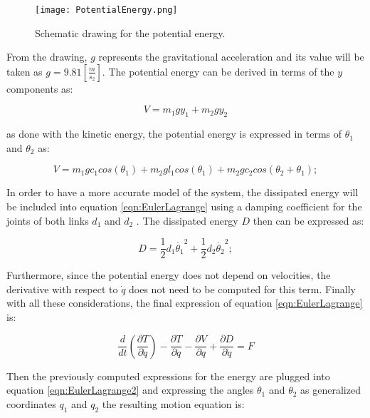 \documentclass[main.tex]{subfiles}
\begin{document}
\begin{figure}[h]
\centering
\texttt{[image: PotentialEnergy.png]}
\caption{\label{fig:PotentialEnergy} Schematic drawing for the potential energy.}
\end{figure}


From the drawing, $g$  represents the gravitational acceleration and its value will be taken as $g=9.81 [\frac{m}{s_2}]$. The potential energy can be derived in terms of the $y$ components as:

\begin{equation}
V = m_1 g y_1 + m_2 g y_2
\end{equation}

as done with the kinetic energy, the potential energy is expressed in terms of $\theta_1$ and $\theta_2$ as:

\begin{equation}
V = m_1 g c_1 cos(\theta_1) + m_2 g l_1 cos(\theta_1) + m_2 g c_2cos(\theta_2 + \theta_1);
\end{equation}

In order to have a more accurate model of the system, the dissipated energy will be included into equation \ref{eqn:EulerLagrange} using a damping coefficient for the joints of both links $d_1$  and $d_2$ . The dissipated energy $D$ then can be expressed as:

\begin{equation}
D =\frac{1}{2} d_1 \dot{\theta_1}^2 + \frac{1}{2}d_2\dot{\theta_2}^2;
\end{equation}

Furthermore, since the potential energy does not depend on velocities, the derivative with respect to $\dot{q}$ does not need to be computed for this term. Finally with all these considerations, the final expression of equation \ref{eqn:EulerLagrange} is:

\begin{equation}\label{eqn:EulerLagrange2} 
\frac{d}{dt}\left(\frac{\partial T}{\partial \dot{q}}\right) - \frac{\partial T}{\partial q} - \frac{\partial V}{\partial q} +  \frac{\partial D}{\partial \dot{q}}= F
\end{equation}

Then the previously computed expressions for the energy are plugged into equation \ref{eqn:EulerLagrange2} and expressing the angles $\theta_1$ and $\theta_2$ as generalized coordinates $q_1$ and $q_2$ the resulting motion equation is:
\end{document}
